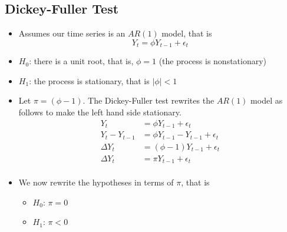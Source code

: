 \documentclass[11pt]{article}
\begin{document}
\subsection{Dickey-Fuller Test}
\begin{itemize}
    \item Assumes our time series is an $AR(1)$ model, that is 
    \[ Y_t = \phi Y_{t-1} + \epsilon_t \]
    \item $H_0$: there is a unit root, that is, $\phi = 1$ (the process is nonstationary)
    \item $H_1$: the process is stationary, that is $|\phi|<1$
    \item Let $\pi = (\phi - 1)$. The Dickey-Fuller test rewrites the $AR(1)$ model as follows
    to make the left hand side stationary.
    \begin{align*}
        Y_t &= \phi Y_{t-1} + \epsilon_t \\
        Y_t - Y_{t-1} &= \phi Y_{t-1} - Y_{t-1} + \epsilon_t \\
        \Delta Y_t &= (\phi - 1) Y_{t-1} + \epsilon_t \\
        \Delta Y_t &= \pi Y_{t-1} + \epsilon_t \\
    \end{align*}
    \item We now rewrite the hypotheses in terms of $\pi$, that is 
    \begin{itemize}
        \item $H_0$: $\pi = 0$
        \item $H_1$: $\pi < 0$
    \end{itemize}
\end{itemize}
\end{document}

